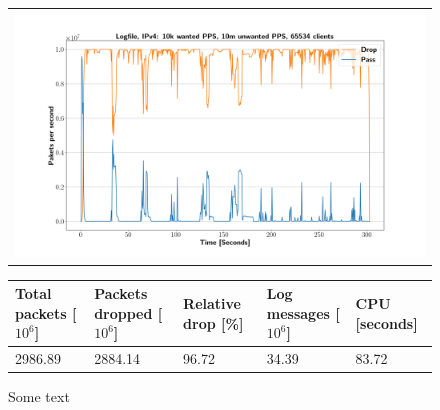 \begin{figure}[p]
	\label{fig:simplefail2ban:disk:ip4:10m}
	\centering
	\scriptsize
	\begin{tabular}{c}
    	\centerline{\includegraphics[width=1.2\textwidth]{images/simplefail2ban_disk_ipv4_v10k_iv10m_c65534.png}}
	\end{tabular}
	\begin{tabular}{lllll}
		\toprule
		\textbf{Total packets [$10^6$]} & \textbf{Packets dropped [$10^6$]} & \textbf{Relative drop [\%]} & \textbf{Log messages [$10^6$]} & \textbf{CPU [seconds]} \\ \midrule 
		2986.89 & 2884.14 & 96.72 & 34.39 & 83.72 \\
		\bottomrule
	\end{tabular}
	\caption[Simplefail2ban, Logfile IPv4, 10m \ac{PPS}]{Some text}
\end{figure}


